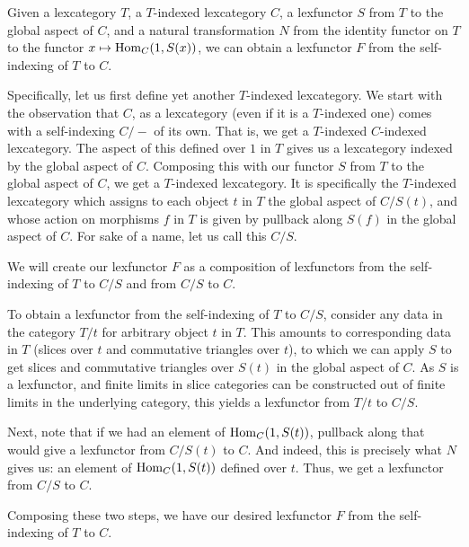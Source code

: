 \begin{construction}\label{InvertSAndN}
Given a lexcategory $T$, a $T$-indexed lexcategory $C$, a lexfunctor $S$ from $T$ to the global aspect of $C$, and a natural transformation $N$ from the identity functor on $T$ to the functor $x \mapsto \mathrm{Hom}_C(1, S(x))$, we can obtain a lexfunctor $F$ from the self-indexing of $T$ to $C$.

Specifically, let us first define yet another $T$-indexed lexcategory. We start with the observation that $C$, as a lexcategory (even if it is a $T$-indexed one) comes with a self-indexing $C/-$ of its own. That is, we get a $T$-indexed $C$-indexed lexcategory. The aspect of this defined over $1$ in $T$ gives us a lexcategory indexed by the global aspect of $C$. Composing this with our functor $S$ from $T$ to the global aspect of $C$, we get a $T$-indexed lexcategory. It is specifically the $T$-indexed lexcategory which assigns to each object $t$ in $T$ the global aspect of $C/S(t)$, and whose action on morphisms $f$ in $T$ is given by pullback along $S(f)$ in the global aspect of $C$. For sake of a name, let us call this $C/S$.

We will create our lexfunctor $F$ as a composition of lexfunctors from the self-indexing of $T$ to $C/S$ and from $C/S$ to $C$.

To obtain a lexfunctor from the self-indexing of $T$ to $C/S$, consider any data in the category $T/t$ for arbitrary object $t$ in $T$. This amounts to corresponding data in $T$ (slices over $t$ and commutative triangles over $t$), to which we can apply $S$ to get slices and commutative triangles over $S(t)$ in the global aspect of $C$. As $S$ is a lexfunctor, and finite limits in slice categories can be constructed out of finite limits in the underlying category, this yields a lexfunctor from $T/t$ to $C/S$. 

Next, note that if we had an element of $\mathrm{Hom}_C(1, S(t))$, pullback along that would give a lexfunctor from $C/S(t)$ to $C$. And indeed, this is precisely what $N$ gives us: an element of $\mathrm{Hom}_C(1, S(t))$ defined over $t$. Thus, we get a lexfunctor from $C/S$ to $C$. 

Composing these two steps, we have our desired lexfunctor $F$ from the self-indexing of $T$ to $C$.
\end{construction}

